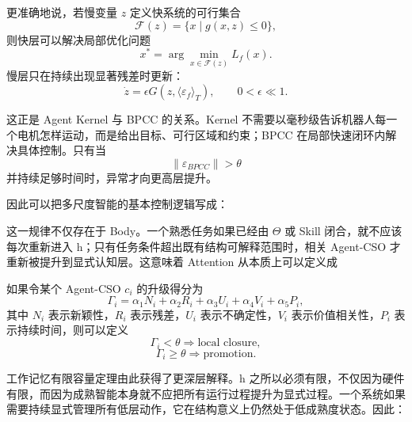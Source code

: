 更准确地说，若慢变量 $z$ 定义快系统的可行集合
\begin{equation}
\mathcal{F}(z)
=
\{x\mid g(x,z)\leq 0\},
\end{equation}
则快层可以解决局部优化问题
\begin{equation}
x^{*}
=
\arg\min_{x\in\mathcal{F}(z)}
L_f(x).
\end{equation}
慢层只在持续出现显著残差时更新：
\begin{equation}
\dot z
=
\epsilon
G
\left(
z,
\langle \varepsilon_f\rangle_T
\right),
\qquad
0<\epsilon\ll1.
\end{equation}

这正是 Agent Kernel 与 BPCC 的关系。Kernel 不需要以毫秒级告诉机器人每一个电机怎样运动，而是给出目标、可行区域和约束；BPCC 在局部快速闭环内解决具体控制。只有当
\begin{equation}
\|\varepsilon_{BPCC}\|
>
\theta
\end{equation}
并持续足够时间时，异常才向更高层提升。

因此可以把多尺度智能的基本控制逻辑写成：
\begin{statementbox}
\centering
{}
\end{statementbox}

这一规律不仅存在于 Body。一个熟悉任务如果已经由 $\Theta$ 或 Skill 闭合，就不应该每次重新进入 h；只有任务条件超出既有结构可解释范围时，相关 Agent-CSO 才重新被提升到显式认知层。这意味着 Attention 从本质上可以定义成
\begin{statementbox}
\centering
{}
\end{statementbox}

如果令某个 Agent-CSO $c_i$ 的升级得分为
\begin{equation}
\Gamma_i
=
\alpha_1N_i
+
\alpha_2R_i
+
\alpha_3U_i
+
\alpha_4V_i
+
\alpha_5P_i,
\end{equation}
其中 $N_i$ 表示新颖性，$R_i$ 表示残差，$U_i$ 表示不确定性，$V_i$ 表示价值相关性，$P_i$ 表示持续时间，则可以定义
\begin{equation}
\Gamma_i<\theta
\Rightarrow
\text{local closure},
\end{equation}
\begin{equation}
\Gamma_i\geq\theta
\Rightarrow
\text{promotion}.
\end{equation}

工作记忆有限容量定理由此获得了更深层解释。h 之所以必须有限，不仅因为硬件有限，而因为成熟智能本身就不应把所有运行过程提升为显式过程。一个系统如果需要持续显式管理所有低层动作，它在结构意义上仍然处于低成熟度状态。因此：
\begin{statementbox}
\centering
{}
\end{statementbox}


